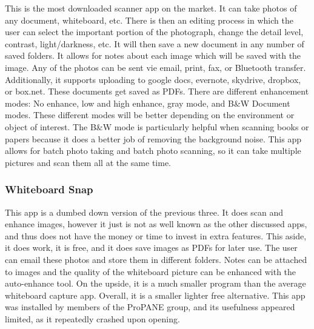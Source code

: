 \documentclass{article}
\begin{document}
This is the most downloaded scanner app on the market. It can take photos of any document, whiteboard, etc. There is then an editing process in which the user can select the important portion of the photograph, change the detail level, contrast, light/darkness, etc. It will then save a new document in any number of saved folders. It allows for notes about each image which will be saved with the image. Any of the photos can be sent vie email, print, fax, or Bluetooth transfer. Additionally, it supports uploading to google docs, evernote, skydrive, dropbox, or box.net. These documents get saved as PDFs. There are different enhancement modes: No enhance, low and high enhance, gray mode, and B\&W Document modes. These different modes will be better depending on the environment or object of interest. The B\&W mode is particularly helpful when scanning books or papers because it does a better job of removing the background noise. This app allows for batch photo taking and batch photo scanning, so it can take multiple pictures and scan them all at the same time. \cite{camscan} \\
				\subsubsection*{Whiteboard Snap}
					
This app is a dumbed down version of the previous three. It does scan and enhance images, however it just is not as well known as the other discussed apps, and thus does not have the money or time to invest in extra features. This aside, it does work, it is free, and it does save images as PDFs for later use. The user can email these photos and store them in different folders. Notes can be attached to images and the quality of the whiteboard picture can be enhanced with the auto-enhance tool. On the upside, it is a much smaller program than the average whiteboard capture app. Overall, it is a smaller lighter free alternative. This app was installed by members of the ProPANE group, and its usefulness appeared limited, as it repeatedly crashed upon opening. \cite{wbs}  \\
\end{document}
